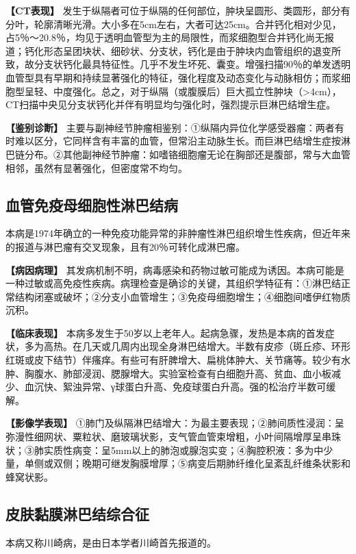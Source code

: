 \textbf{【CT表现】}
发生于纵隔者可位于纵隔的任何部位，肿块呈圆形、类圆形，部分有分叶，轮廓清晰光滑。大小多在5cm左右，大者可达25cm。合并钙化相对少见，占5％～20.8％，均见于透明血管型为主的局限性，而浆细胞型合并钙化尚无报道；钙化形态呈团块状、细砂状、分支状，钙化是由于肿块内血管组织的退变所致，故分支状钙化最具特征性。几乎不发生坏死、囊变。增强扫描90％的单发透明血管型具有早期和持续显著强化的特征，强化程度及动态变化与动脉相仿；而浆细胞型呈轻、中度强化。总之，对于纵隔（或腹膜后）巨大孤立性肿块（\textgreater{}4cm），CT扫描中央见分支状钙化并伴有明显均匀强化时，强烈提示巨淋巴结增生症。

\textbf{【鉴别诊断】}
主要与副神经节肿瘤相鉴别：①纵隔内异位化学感受器瘤：两者有时难以区分，它同样含有丰富的血管，但常沿主动脉生长。而巨淋巴结增生症按淋巴链分布。②其他副神经节肿瘤：如嗜铬细胞瘤无论在胸部还是腹部，常与大血管相邻，虽然有显著强化，但密度常不均匀。

\subsection{血管免疫母细胞性淋巴结病}

本病是1974年确立的一种免疫功能异常的非肿瘤性淋巴组织增生性疾病，但近年来的报道与淋巴瘤有交叉现象，且有20％可转化成淋巴瘤。

\textbf{【病因病理】}
其发病机制不明，病毒感染和药物过敏可能成为诱因。本病可能是一种过敏或高免疫性疾病。病理检查是确诊的关键，其组织学特征有：①淋巴结正常结构闭塞或破坏；②分支小血管增生；③免疫母细胞增生；④细胞间嗜伊红物质沉积。

\textbf{【临床表现】}
本病多发生于50岁以上老年人。起病急骤，发热是本病的首发症状，多为高热。在几天或几周内出现全身淋巴结增大。半数有皮疹（斑丘疹、环形红斑或皮下结节）伴瘙痒。有些可有肝脾增大、扁桃体肿大、关节痛等。较少有水肿、胸腹水、肺部浸润、腮腺增大。实验室检查有白细胞升高、贫血、血小板减少、血沉快、絮浊异常、γ球蛋白升高、免疫球蛋白升高。强的松治疗半数可缓解。

\textbf{【影像学表现】}
①肺门及纵隔淋巴结增大：为最主要表现；②肺间质性浸润：呈弥漫性细网状、粟粒状、磨玻璃状影，支气管血管束增粗，小叶间隔增厚呈串珠状；③肺实质性病变：呈5mm以上的肺泡或腺泡实变；④胸腔积液：多为中少量，单侧或双侧；晚期可继发胸膜增厚；⑤病变后期肺纤维化呈紊乱纤维条状影和蜂窝状影。

\subsection{皮肤黏膜淋巴结综合征}

本病又称川崎病，是由日本学者川崎首先报道的。

